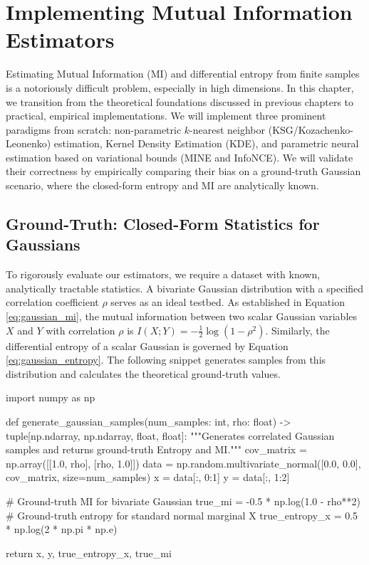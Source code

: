\chapter{Implementing Mutual Information Estimators}
\label{ch:mi_estimators}

Estimating Mutual Information (MI) and differential entropy from finite samples is a notoriously difficult problem, especially in high dimensions. In this chapter, we transition from the theoretical foundations discussed in previous chapters to practical, empirical implementations. We will implement three prominent paradigms from scratch: non-parametric $k$-nearest neighbor (KSG/Kozachenko-Leonenko) estimation, Kernel Density Estimation (KDE), and parametric neural estimation based on variational bounds (MINE and InfoNCE). We will validate their correctness by empirically comparing their bias on a ground-truth Gaussian scenario, where the closed-form entropy and MI are analytically known.

\section{Ground-Truth: Closed-Form Statistics for Gaussians}

To rigorously evaluate our estimators, we require a dataset with known, analytically tractable statistics. A bivariate Gaussian distribution with a specified correlation coefficient $\rho$ serves as an ideal testbed. As established in Equation \ref{eq:gaussian_mi}, the mutual information between two scalar Gaussian variables $X$ and $Y$ with correlation $\rho$ is $I(X; Y) = -\frac{1}{2} \log(1 - \rho^2)$. Similarly, the differential entropy of a scalar Gaussian is governed by Equation \ref{eq:gaussian_entropy}. The following snippet generates samples from this distribution and calculates the theoretical ground-truth values.

\begin{pycode}
import numpy as np

def generate_gaussian_samples(num_samples: int, rho: float) -> tuple[np.ndarray, np.ndarray, float, float]:
    """Generates correlated Gaussian samples and returns ground-truth Entropy and MI."""
    cov_matrix = np.array([[1.0, rho], [rho, 1.0]])
    data = np.random.multivariate_normal([0.0, 0.0], cov_matrix, size=num_samples)
    x = data[:, 0:1]
    y = data[:, 1:2]
    
    # Ground-truth MI for bivariate Gaussian
    true_mi = -0.5 * np.log(1.0 - rho**2)
    # Ground-truth entropy for standard normal marginal X
    true_entropy_x = 0.5 * np.log(2 * np.pi * np.e)
    
    return x, y, true_entropy_x, true_mi
\end{pycode}

